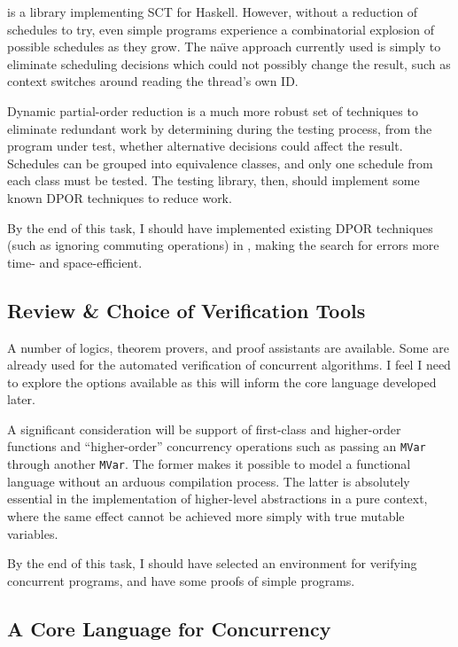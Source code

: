 \dejafu{} is a library implementing SCT for Haskell. However, without
a reduction of schedules to try, even simple programs experience a
combinatorial explosion of possible schedules as they grow. The
na\"{\i}ve approach currently used is simply to eliminate scheduling
decisions which could not possibly change the result, such as context
switches around reading the thread's own ID.

Dynamic partial-order reduction is a much more robust set of
techniques to eliminate redundant work by determining during the
testing process, from the program under test, whether alternative
decisions could affect the result. Schedules can be grouped into
equivalence classes, and only one schedule from each class must be
tested. The testing library, then, should implement some known DPOR
techniques to reduce work.

By the end of this task, I should have implemented existing DPOR
techniques (such as ignoring commuting operations) in \dejafu{},
making the search for errors more time- and space-efficient.

\subsection*{Review \& Choice of Verification Tools}
\label{sec:proposal-tasks-tools}

A number of logics, theorem provers, and proof assistants are
available. Some are already used for the automated verification of
concurrent algorithms. I feel I need to explore the options available
as this will inform the core language developed later.

A significant consideration will be support of first-class and
higher-order functions and ``higher-order'' concurrency operations
such as passing an \verb|MVar| through another \verb|MVar|. The former
makes it possible to model a functional language without an arduous
compilation process. The latter is absolutely essential in the
implementation of higher-level abstractions in a pure context, where
the same effect cannot be achieved more simply with true mutable
variables.

By the end of this task, I should have selected an environment for
verifying concurrent programs, and have some proofs of simple
programs.

\subsection*{A Core Language for Concurrency}
\label{sec:proposal-tasks-core}

